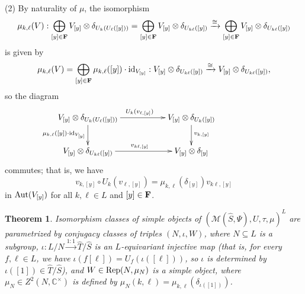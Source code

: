 \documentclass{amsart}
\newtheorem{theorem}{Theorem}[section]
\theoremstyle{definition}
\newcommand{\id}{{\rm id}}
\newcommand{\M}{\mathscr{M}}
\newcommand{\ot}{\otimes}
\numberwithin{equation}{section}
\begin{document}
(2) By naturality of $\mu$, the isomorphism 
$$\mu_{k,\ell}(V): 
\bigoplus_{[y]\in {\bf F}}V_{[y]}\ot\delta_{U_k(U_\ell([y]))}=\bigoplus_{[y]\in {\bf F}}V_{[y]}\ot\delta_{U_{k\ell}([y])}
\xrightarrow{\cong}\bigoplus_{[y]\in {\bf F}}V_{[y]}\ot\delta_{U_{k\ell}([y])}
$$ 
is given by  
$$\mu_{k,\ell}(V)=\bigoplus_{[y]\in {\bf F}}\mu_{k,\ell}([y])\cdot \id_{V_{[y]}}:V_{[y]}\ot\delta_{U_{k\ell}([y])}\xrightarrow{\cong}V_{[y]}\ot\delta_{U_{k\ell}([y])},$$ 
so the diagram
\begin{equation*}
\xymatrix{V_{[y]}\ot\delta_{U_k(U_{\ell}([y]))}\ar[d]_{\mu_{k,\ell}([y])\cdot \id_{V_{[y]}}}\ar[rr]^{U_k(v_{\ell,[y]})}&&V_{[y]}\ot\delta_{U_k([y])}\ar[d]^{v_{k,[y]}} &&\\
V_{[y]}\ot\delta_{U_{k\ell}([y])}\ar[rr]^{v_{k\ell,[y]}}&& V_{[y]}\ot\delta_{[y]}&&}
\end{equation*}
commutes; that is, we have 
\begin{equation}\label{vsat}
v_{k,[y]}\circ U_k(v_{\ell,[y]})=\mu_{k,\ell}(\delta_{[y]})v_{k\ell,[y]}
\end{equation}
in ${\rm Aut}(V_{[y]})$ for all $k,\ell\in L$ and $[y]\in {\bf F}$.
 
\begin{theorem}\label{simpleuiv}
Isomorphism classes of simple objects of $\left(\M(\widehat{S},\Psi),U,\tau,\mu\right)^L$ are parametrized by conjugacy classes of triples $(N,\iota,W)$, where $N\subseteq L$ is a subgroup, $\iota:L/N\xrightarrow{1:1} \widehat{T}/\widehat{S}$ is an $L$-equivariant injective map (that is, for every $f,\ell\in L$, we have $\iota(f[\ell])=U_f(\iota([\ell]))$, so $\iota$ is determined by $\iota([1])\in \widehat{T}/\widehat{S}$), and $W\in {\rm Rep}(N,\mu_N)$ is a simple object, where $\mu_N\in Z^2(N,\mathbb{C}^{\times})$ is defined by $\mu_N(k,\ell)=\mu_{k,\ell}(\delta_{\iota([1])})$.
\end{theorem}
\end{document}
